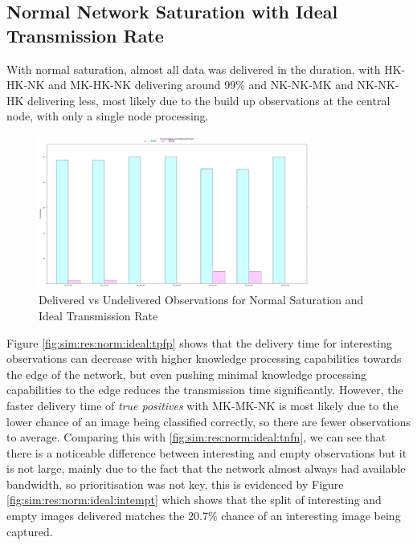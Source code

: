 \subsection{Normal Network Saturation with Ideal Transmission Rate}

With normal saturation, almost all data was delivered in the duration, with HK-HK-NK and MK-HK-NK delivering around 99\% and NK-NK-MK and NK-NK-HK delivering less, most likely due to the build up observations at the central node, with only a single node processing.

	\begin{figure}[h]
	\centering
	\includegraphics[width=0.8\textwidth]{Chap7/figures/plots/normal_ideal/delvsundel_percent.png}
	\caption{Delivered vs Undelivered Observations for Normal Saturation and Ideal Transmission Rate}
	\label{fig:sim:res:norm:ideal:delundel}
	\end{figure}

	Figure \ref{fig:sim:res:norm:ideal:tpfp} shows that the delivery time for interesting observations can decrease with higher knowledge processing capabilities towards the edge of the network, but even pushing minimal knowledge processing capabilities to the edge reduces the transmission time significantly. However, the faster delivery time of \textit{true positives} with MK-MK-NK is most likely due to the lower chance of an image being classified correctly, so there are fewer observations to average. Comparing this with \ref{fig:sim:res:norm:ideal:tnfn}, we can see that there is a noticeable difference between interesting and empty observations but it is not large, mainly due to the fact that the network almost always had available bandwidth, so prioritisation was not key, this is evidenced by Figure \ref{fig:sim:res:norm:ideal:intempt} which shows that the split of interesting and empty images delivered matches the 20.7\% chance of an interesting image being captured.


